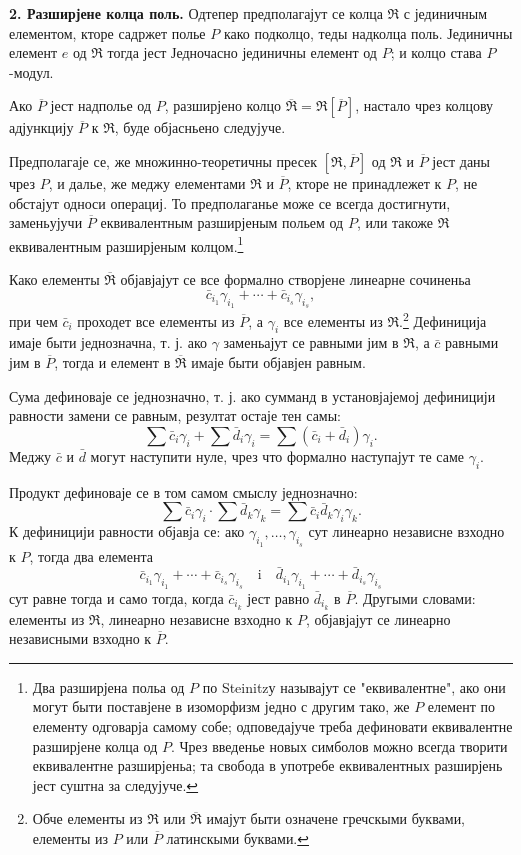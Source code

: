 \documentclass[11pt]{article}
\begin{document}
\textbf{2. Разширјене колца поль.} Одтепер предполагајут се колца $\mathfrak R$ с јединичным елементом, кторе садржет полье $P$ како подколцо, теды надколца поль. Јединичны елемент $e$ од $\mathfrak R$ тогда јест Једночасно јединичны елемент од $P$; и колцо става $P$-модул.

Ако $\overline P$ јест надполье од $P$, разширјено колцо $\overline{\mathfrak R}=\mathfrak R[\overline P]$, настало чрез колцову адјункцију $\overline P$ к $\mathfrak R$, буде објасньено следујуче.

Предполагаје се, же множинно-теоретичны пресек $[\mathfrak R,\overline P]$ од $\mathfrak R$ и $\overline P$ јест даны чрез $P$, и далье, же меджу елементами $\mathfrak R$ и $\overline P$, кторе не принадлежет к $P$, не обстајут односи операциј. То предполаганье може се всегда достигнути, заменьујучи $\overline P$ еквивалентным разширјеным польем од $P$, или такоже $\mathfrak R$ еквивалентным разширјеным колцом.\footnote{Два разширјена польа од $P$ по Steinitzу называјут се "еквивалентне", ако они могут быти поставјене в изоморфизм једно с другим тако, же $P$ елемент по елементу одговарја самому собе; одповедајуче треба дефиновати еквивалентне разширјене колца од $P$. Чрез введенье новых симболов можно всегда творити еквивалентне разширјеньа; та свобода в употребе еквивалентных разширјень јест суштна за следујуче.}

Како елементы $\overline{\mathfrak R}$ објавјајут се все формално створјене линеарне сочиненьа
\[
   \bar c_{i_1}\gamma_{i_1}+\cdots+\bar c_{i_s}\gamma_{i_s},
\]
при чем $\bar c_i$ проходет все елементы из $\overline P$, а $\gamma_i$ все елементы из $\mathfrak R$.\footnote{Обче елементы из $\mathfrak R$ или $\overline{\mathfrak R}$ имајут быти означене гречскыми буквами, елементы из $P$ или $\overline P$ латинскыми буквами.} Дефиниција имаје быти једнозначна, т. ј. ако $\gamma$ заменьајут се равными јим в $\mathfrak R$, а $\bar c$ равными јим в $\overline P$, тогда и елемент в $\overline{\mathfrak R}$ имаје быти објавјен равным.

Сума дефиноваје се једнозначно, т. ј. ако сумманд в установјајемој дефиницији равности замени се равным, резултат остаје тен самы:
\[
   \sum \bar c_i\gamma_i+\sum \bar d_i\gamma_i
   =\sum(\bar c_i+\bar d_i)\gamma_i .
\]
Меджу $\bar c$ и $\bar d$ могут наступити нуле, чрез что формално наступајут те саме $\gamma_i$.

Продукт дефиноваје се в том самом смыслу једнозначно:
\[
   \sum \bar c_i\gamma_i\cdot \sum \bar d_k\gamma_k
   =\sum \bar c_i\bar d_k\gamma_i\gamma_k .
\]
К дефиницији равности објавја се: ако $\gamma_{i_1},\ldots,\gamma_{i_s}$ сут линеарно независне взходно к $P$, тогда два елемента
\[
   \bar c_{i_1}\gamma_{i_1}+\cdots+\bar c_{i_s}\gamma_{i_s}
   \quad\text{i}\quad
   \bar d_{i_1}\gamma_{i_1}+\cdots+\bar d_{i_s}\gamma_{i_s}
\]
сут равне тогда и само тогда, когда $\bar c_{i_k}$ јест равно $\bar d_{i_k}$ в $\overline P$. Другыми словами: елементы из $\mathfrak R$, линеарно независне взходно к $P$, објавјајут се линеарно независными взходно к $\overline P$.
\end{document}
